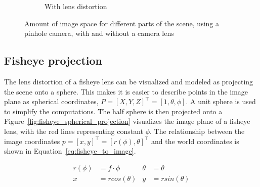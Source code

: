 \begin{figure}[!htb]
\begin{subfigure}[b]{0.45\textwidth}
    \caption{With lens distortion}
    \label{fig:wide_angle_pinhole_lens}
    \end{subfigure}
    
    \caption{Amount of image space for different parts of the scene, using a pinhole camera, with and without a camera lens}
    \label{fig:wide_angle_pinhole}
    
\end{figure}

\subsection{Fisheye projection}

The lens distortion of a fisheye lens can be visualized and modeled as projecting the scene onto a sphere. This makes it is easier to describe points in the image plane as spherical coordinates, $P = [X,Y,Z]^\top = [1, \theta,\phi]$. A unit sphere is used to simplify the computations. The half sphere is then projected onto a  Figure~\ref{fig:fisheye_spherical_projection} visualizes the image plane of a fisheye lens, with the red lines representing constant $\phi$. The relationship between the image coordinates $p = [x,y]^\top = [r(\phi),\theta]^\top$ and the world coordinates is shown in Equation~\eqref{eq:fisheye_to_image}.

\begin{align}
    r(\phi) &= f \cdot \phi & \theta &= \theta \nonumber \\
    x &= rcos(\theta) & y &= rsin(\theta)
    \label{eq:fisheye_to_image}
\end{align}

